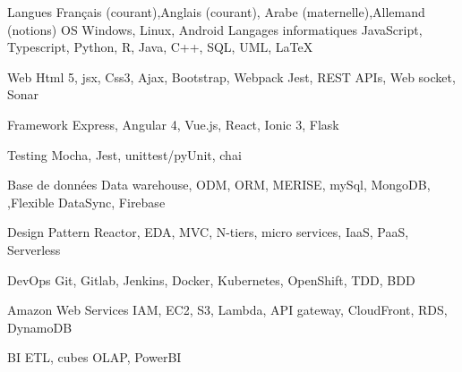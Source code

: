 

\begin{cvskills}
  \cvskill
    {Langues } %
    {Français  (courant),Anglais (courant), Arabe (maternelle),Allemand (notions)} %
  \cvskill
    {OS} %
    {Windows, Linux, Android} %
  \cvskill
    {Langages informatiques} %
    {JavaScript, Typescript, Python, R, Java, C++, SQL, UML, LaTeX} %

  \cvskill
    {Web} %
    {Html 5, jsx, Css3, Ajax, Bootstrap, Webpack Jest, REST APIs, Web socket, Sonar} %

  \cvskill
    {Framework} %
    {Express, Angular 4, Vue.js, React, Ionic 3, Flask} %

\cvskill
    {Testing} %
    {Mocha, Jest, unittest/pyUnit, chai} %

  \cvskill
    {Base de données} %
    {Data warehouse, ODM, ORM, MERISE, mySql, MongoDB, ,Flexible DataSync, Firebase } %

  \cvskill
    {Design Pattern} %
    {Reactor, EDA, MVC, N-tiers, micro services, IaaS, PaaS, Serverless } %

  \cvskill
    {DevOps} %
    {Git, Gitlab, Jenkins, Docker, Kubernetes, OpenShift, TDD, BDD  } %

\cvskill
    {Amazon Web Services} %
    {IAM, EC2, S3, Lambda, API gateway, CloudFront, RDS, DynamoDB } %

\cvskill
    {BI} %
    {ETL, cubes OLAP, PowerBI } %


\end{cvskills}
